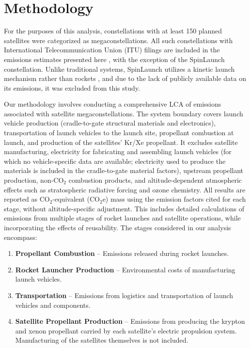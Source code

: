 \documentclass[pdflatex,sn-mathphys-num]{sn-jnl}
\theoremstyle{thmstyleone}%
\theoremstyle{thmstyletwo}%
\theoremstyle{thmstylethree}%
\begin{document}
\section{Methodology}\label{sec4}

For the purposes of this analysis, constellations with at least 150 planned satellites were categorized as megaconstellations. All such constellations with International Telecommunication Union (ITU) filings are included in the emissions estimates presented here \citep{itu_e-submission_nodate}, with the exception of the SpinLaunch constellation. Unlike traditional systems, SpinLaunch utilizes a kinetic launch mechanism rather than rockets \citep{noauthor_spinlaunch_nodate}, and due to the lack of publicly available data on its emissions, it was excluded from this study.

Our methodology involves conducting a comprehensive LCA of emissions associated with satellite megaconstellations. The system boundary covers launch vehicle production (cradle-to-gate structural materials and electronics), transportation of launch vehicles to the launch site, propellant combustion at launch, and production of the satellites' Kr/Xe propellant. It excludes satellite manufacturing, electricity for fabricating and assembling launch vehicles (for which no vehicle-specific data are available; electricity used to produce the materials is included in the cradle-to-gate material factors), upstream propellant production, non-CO$_2$ combustion products, and altitude-dependent atmospheric effects such as stratospheric radiative forcing and ozone chemistry. All results are reported as CO$_2$-equivalent (CO$_2$e) mass using the emission factors cited for each stage, without altitude-specific adjustment. This includes detailed calculations of emissions from multiple stages of rocket launches and satellite operations, while incorporating the effects of reusability. The stages considered in our analysis encompass:

\begin{enumerate}
    \item \textbf{Propellant Combustion} – Emissions released during rocket launches.
    \item \textbf{Rocket Launcher Production} – Environmental costs of manufacturing launch vehicles.
    \item \textbf{Transportation} – Emissions from logistics and transportation of launch vehicles and components.
    \item \textbf{Satellite Propellant Production} – Emissions from producing the krypton and xenon propellant carried by each satellite's electric propulsion system. Manufacturing of the satellites themselves is not included.
\end{enumerate}
\end{document}
